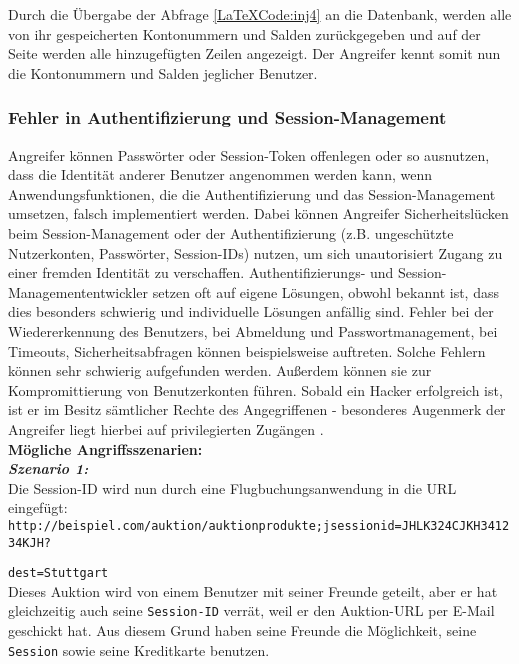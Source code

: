 Durch die Übergabe der Abfrage \ref{LaTeXCode:inj4} an die Datenbank, werden alle von ihr gespeicherten Kontonummern und Salden zurückgegeben und auf der Seite werden alle hinzugefügten Zeilen angezeigt. Der Angreifer kennt somit nun die Kontonummern und Salden jeglicher Benutzer.

\subsubsection{Fehler in Authentifizierung und Session-Management}

Angreifer können Passwörter oder Session-Token offenlegen oder so ausnutzen, dass die Identität anderer Benutzer angenommen werden kann, wenn Anwendungsfunktionen, die die Authentifizierung und das Session-Management umsetzen, falsch implementiert werden. Dabei können Angreifer Sicherheitslücken beim Session-Management oder der Authentifizierung (z.B. ungeschützte Nutzerkonten, Passwörter, Session-IDs) nutzen, um sich unautorisiert Zugang zu einer fremden Identität zu verschaffen. Authentifizierungs- und Session-Managemententwickler setzen oft auf eigene Lösungen, obwohl bekannt ist, dass dies besonders schwierig und individuelle Lösungen anfällig sind. Fehler bei der Wiedererkennung des Benutzers, bei Abmeldung und Passwortmanagement, bei Timeouts, Sicherheitsabfragen können beispielsweise auftreten. Solche Fehlern können sehr schwierig aufgefunden werden. Außerdem können sie zur Kompromittierung von Benutzerkonten führen. Sobald ein Hacker erfolgreich ist, ist er im Besitz sämtlicher Rechte des Angegriffenen - besonderes Augenmerk der Angreifer liegt hierbei auf privilegierten Zugängen \cite{owasp13top10}.\\

\textbf{Mögliche Angriffsszenarien:}\\

\textbf{\textit{Szenario 1:}}\\
Die Session-ID wird nun durch eine Flugbuchungsanwendung   in die URL eingefügt\cite{owasp13top10}:\\


\texttt{http://beispiel.com/auktion/auktionprodukte;jsessionid=JHLK324CJKH341234KJH?}

\texttt{dest=Stuttgart}\\

Dieses Auktion wird von einem Benutzer mit seiner Freunde geteilt, aber er hat gleichzeitig auch seine \texttt{Session-ID} verrät, weil er den Auktion-URL per E-Mail geschickt hat. Aus diesem Grund  haben seine Freunde die Möglichkeit, seine \texttt{Session} sowie seine Kreditkarte benutzen.\\

